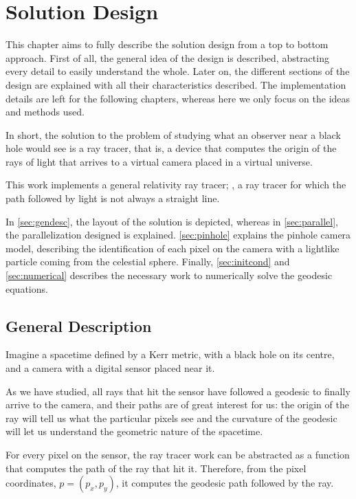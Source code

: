 \chapter{Solution Design}
\label{chapter:design}

This chapter aims to fully describe the solution design from a top to bottom approach. First of all, the general idea of the design is described, abstracting every detail to easily understand the whole. Later on, the different sections of the design are explained with all their characteristics described. The implementation details are left for the following chapters, whereas here we only focus on the ideas and methods used.

In short, the solution to the problem of studying what an observer near a black hole would see is a ray tracer, that is, a device that computes the origin of the rays of light that arrives to a virtual camera placed in a virtual universe.

This work implements a general relativity ray tracer; \ie, a ray tracer for which the path followed by light is not always a straight line.

In \autoref{sec:gendesc}, the layout of the solution is depicted, whereas in \autoref{sec:parallel}, the parallelization designed is explained. \autoref{sec:pinhole} explains the pinhole camera model, describing the identification of each pixel on the camera with a lightlike particle coming from the celestial sphere. Finally, \autoref{sec:initcond} and \autoref{sec:numerical} describes the necessary work to numerically solve the geodesic equations.

\section{General Description}
\label{sec:gendesc}

Imagine a spacetime defined by a Kerr metric, with a black hole on its centre, and a camera with a digital sensor placed near it.

As we have studied, all rays that hit the sensor have followed a geodesic to finally arrive to the camera, and their paths are of great interest for us: the origin of the ray will tell us what the particular pixels see and the curvature of the geodesic will let us understand the geometric nature of the spacetime.

For every pixel on the sensor, the ray tracer work can be abstracted as a function that computes the path of the ray that hit it. Therefore, from the pixel coordinates, $p = (p_x, p_y)$, it computes the geodesic path followed by the ray.

